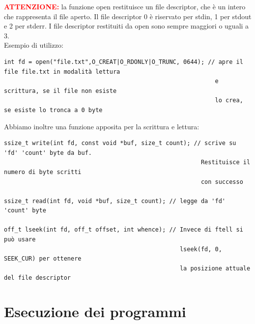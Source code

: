 \textbf{\textcolor{red}{ATTENZIONE:}} la funzione open restituisce un file descriptor, che è un intero che rappresenta il file aperto. 
Il file descriptor 0 è riservato per stdin, 1 per stdout e 2 per stderr. I file descriptor restituiti da open sono sempre maggiori o uguali a 3.\\
Esempio di utilizzo:
\begin{verbatim}
int fd = open("file.txt",O_CREAT|O_RDONLY|O_TRUNC, 0644); // apre il file file.txt in modalità lettura 
                                                            e scrittura, se il file non esiste 
                                                            lo crea, se esiste lo tronca a 0 byte
\end{verbatim}
Abbiamo inoltre una funzione apposita per la scrittura e lettura:
\begin{verbatim}
ssize_t write(int fd, const void *buf, size_t count); // scrive su 'fd' 'count' byte da buf. 
                                                        Restituisce il numero di byte scritti 
                                                        con successo

ssize_t read(int fd, void *buf, size_t count); // legge da 'fd' 'count' byte

off_t lseek(int fd, off_t offset, int whence); // Invece di ftell si può usare
                                                  lseek(fd, 0, SEEK_CUR) per ottenere 
                                                  la posizione attuale del file descriptor
\end{verbatim}
\newpage
\section{Esecuzione dei programmi}
